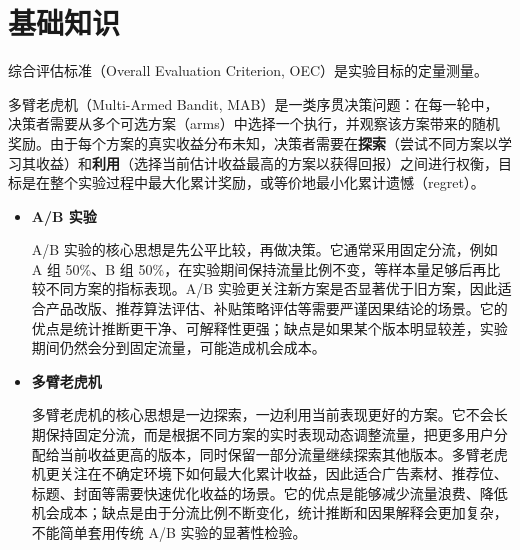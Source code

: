 \chapter{基础知识}



\begin{definition}[综合评估标准]
综合评估标准（Overall Evaluation Criterion, OEC）是实验目标的定量测量。
\end{definition}
\begin{definition}[多臂老虎机]
多臂老虎机（Multi-Armed Bandit, MAB）是一类序贯决策问题：在每一轮中，决策者需要从多个可选方案（arms）中选择一个执行，并观察该方案带来的随机奖励。由于每个方案的真实收益分布未知，决策者需要在\textbf{探索}（尝试不同方案以学习其收益）和\textbf{利用}（选择当前估计收益最高的方案以获得回报）之间进行权衡，目标是在整个实验过程中最大化累计奖励，或等价地最小化累计遗憾（regret）。
\end{definition}
\begin{itemize}
    \item \textbf{A/B 实验}
    
    A/B 实验的核心思想是先公平比较，再做决策。它通常采用固定分流，例如 A 组 50\%、B 组 50\%，在实验期间保持流量比例不变，等样本量足够后再比较不同方案的指标表现。A/B 实验更关注新方案是否显著优于旧方案，因此适合产品改版、推荐算法评估、补贴策略评估等需要严谨因果结论的场景。它的优点是统计推断更干净、可解释性更强；缺点是如果某个版本明显较差，实验期间仍然会分到固定流量，可能造成机会成本。

    \item \textbf{多臂老虎机}

    多臂老虎机的核心思想是一边探索，一边利用当前表现更好的方案。它不会长期保持固定分流，而是根据不同方案的实时表现动态调整流量，把更多用户分配给当前收益更高的版本，同时保留一部分流量继续探索其他版本。多臂老虎机更关注在不确定环境下如何最大化累计收益，因此适合广告素材、推荐位、标题、封面等需要快速优化收益的场景。它的优点是能够减少流量浪费、降低机会成本；缺点是由于分流比例不断变化，统计推断和因果解释会更加复杂，不能简单套用传统 A/B 实验的显著性检验。
\end{itemize}
